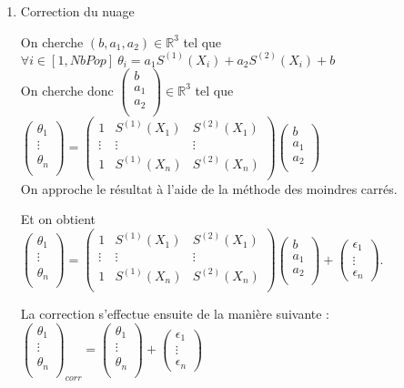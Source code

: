 \begin{enumerate}
  
  \item Correction du nuage

\newcommand{\design}{\begin{pmatrix}
      1 & S^{(1)}(X_1) & S^{(2)}(X_1)\\
      \vdots & \vdots & \vdots\\
      1 & S^{(1)}(X_n) & S^{(2)}(X_n)\\
    \end{pmatrix}}
\newcommand{\param}{\begin{pmatrix}
      \theta_1\\
      \vdots\\
      \theta_n\\
    \end{pmatrix}}
\newcommand{\epsmat}{\begin{pmatrix} 
  \epsilon_1\\
  \vdots\\
  \epsilon_n
\end{pmatrix}}
\newcommand{\coef}{\begin{pmatrix}
    b\\
    a_1\\
    a_2\\
  \end{pmatrix}
}
On cherche $(b, a_1, a_2) \in \mathbb{R}^3$ tel que $\forall i \in [1, NbPop]~\theta_i = a_1S^{(1)}(X_i) + a_2S^{(2)}(X_i) +b$\\
On cherche donc $\coef \in \mathbb{R}^3$ tel que $\param =  \design \coef$ \\
On approche le résultat à l'aide de la méthode des moindres carrés.

Et on obtient $\param = \design \coef + \epsmat.$

La correction s'effectue ensuite de la manière suivante : $\param_{corr} = \param + \epsmat$ \\
\end{enumerate}

